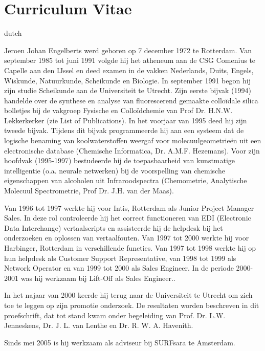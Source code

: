 \chapter*{Curriculum Vitae}
\fancyhead[RO]{\thepage}
\fancyhead[LE]{\thepage}
\begin{otherlanguage*}{dutch}
\label{cv}

Jeroen Johan Engelberts werd geboren op 7 december 1972 te Rotterdam. Van september 1985 tot juni 1991 volgde hij het atheneum aan de CSG Comenius te Capelle aan den IJssel en deed examen in de vakken Nederlands, Duits, Engels, Wiskunde, Natuurkunde, Scheikunde en Biologie. In september 1991 begon hij zijn studie Scheikunde aan de Universiteit te Utrecht. Zijn eerste bijvak (1994) handelde over de synthese en analyse van fluorescerend gemaakte collo\"idale silica bolletjes bij de vakgroep Fysische en Collo\"idchemie van Prof Dr. H.N.W. Lekkerkerker (zie List of Publications). In het voorjaar van 1995 deed hij zijn tweede bijvak. Tijdens dit bijvak programmeerde hij aan een systeem dat de logische benaming van koolwaterstoffen weergaf voor molecuulgeometrie\"en uit een electronische database (Chemische Informatica, Dr. A.M.F. Hezemans). Voor zijn hoofdvak (1995-1997) bestudeerde hij de toepasbaarheid van kunstmatige intelligentie (o.a. neurale netwerken) bij de voorspelling van chemische eigenschappen van alcoholen uit Infraroodspectra (Chemometrie, Analytische Molecuul Spectrometrie, Prof Dr. J.H. van der Maas). 

 Van 1996 tot 1997 werkte hij voor Intis, Rotterdam als Junior Project Manager Sales. In deze rol controleerde hij het correct functioneren van EDI (Electronic Data Interchange) vertaalscripts en assisteerde hij de helpdesk bij het onderzoeken en oplossen van vertaalfouten.  Van 1997 tot 2000 werkte hij voor Harbinger, Rotterdam in verschillende functies. Van 1997 tot 1998 werkte hij op hun helpdesk als Customer Support Representative, van 1998 tot 1999 als Network Operator en van 1999 tot 2000 als Sales Engineer.  In de periode 2000-2001 was hij werkzaam bij Lift-Off als Sales Engineer..

In het najaar van 2000 keerde hij terug naar de Universiteit te Utrecht om zich toe te leggen op zijn promotie onderzoek. De resultaten worden beschreven in dit proefschrift, dat tot stand kwam onder begeleiding van  Prof. Dr. L.W.  Jenneskens, Dr. J. L. van Lenthe en Dr. R. W. A. Havenith.

Sinds mei 2005 is hij werkzaam als adviseur bij SURFsara te Amsterdam.
\end{otherlanguage*}
